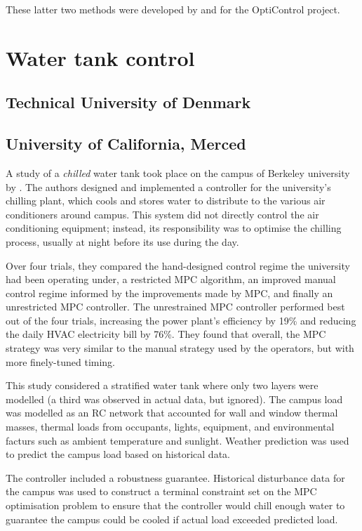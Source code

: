 These latter two methods were developed by and for the OptiControl project.

\section{Water tank control}


\subsection{Technical University of Denmark}

\textcite{Halvgaard12}

\subsection{University of California, Merced}

A study of a {\it chilled} water tank took place on the campus of Berkeley university by \textcite{Ma12}.
The authors designed and implemented a controller for the university's chilling plant, which cools and stores water to distribute to the various air conditioners around campus.
This system did not directly control the air conditioning equipment; instead, its responsibility was to optimise the chilling process, usually at night before its use during the day.

Over four trials, they compared the hand-designed control regime the university had been operating under, a restricted MPC algorithm, an improved manual control regime informed by the improvements made by MPC, and finally an unrestricted MPC controller.
The unrestrained MPC controller performed best out of the four trials, increasing the power plant's efficiency by 19\% and reducing the daily HVAC electricity bill by 76\%.
They found that overall, the MPC strategy was very similar to the manual strategy used by the operators, but with more finely-tuned timing.

This study considered a stratified water tank where only two layers were modelled (a third was observed in actual data, but ignored).
The campus load was modelled as an RC network that accounted for wall and window thermal masses, thermal loads from occupants, lights, equipment, and environmental facturs such as ambient temperature and sunlight.
Weather prediction was used to predict the campus load based on historical data.

The controller included a robustness guarantee.
Historical disturbance data for the campus was used to construct a terminal constraint set on the MPC optimisation problem to ensure that the controller would chill enough water to guarantee the campus could be cooled if actual load exceeded predicted load.

